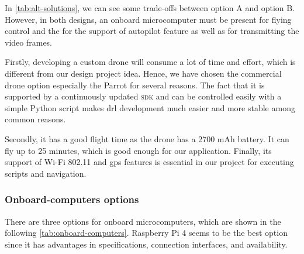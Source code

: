 \documentclass[../main.tex]{subfiles}
\begin{document}
In \cref{tab:alt-solutions}, 
we can see some trade-offs 
between option A and option B. However, in both designs, 
an onboard microcomputer must be present for 
flying control and the for the support of autopilot feature as well as for 
transmitting the video frames. 

Firstly, developing a custom drone will consume a lot of time and effort, 
which is different from our design project idea.
Hence, we have chosen the commercial drone option especially 
the Parrot \anafi for several reasons.
The fact that it is supported by a continuously updated 
\textsc{sdk} and can be controlled easily 
with a simple Python script makes 
\gls{drl} development much easier and more stable among common reasons.

Secondly, it has a good flight time 
as the \anafi drone has a 2700 mAh battery. 
It can fly up to 25 minutes, which is good enough 
for our application.
Finally, its support of Wi-Fi 802.11 and \gls{gps} 
features is essential in our project for 
executing scripts and navigation.

\subsubsection{Onboard-computers options}
There are three options for onboard microcomputers, 
which are shown in the following 
\cref{tab:onboard-computers}. Raspberry Pi 4 seems 
to be the best option since it has advantages 
in specifications, connection interfaces, 
and availability.
\end{document}
